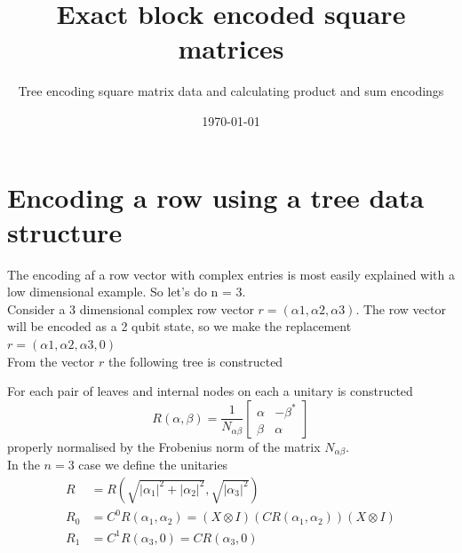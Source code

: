\documentclass[11pt]{article}
\title{Exact block encoded square matrices}
\author{Tree encoding square matrix data and calculating product and sum encodings}
\date{\today}
\begin{document}
\maketitle


%
%

\section*{Encoding a row using a tree data structure}

The encoding af a row vector with complex entries is most easily explained with a low dimensional example. So let's do n = 3. \\

Consider a 3 dimensional complex row vector $r = (\alpha1,\alpha2,\alpha3)$. 
The row vector will be encoded as a 2 qubit state, so we make the replacement  $r = (\alpha1,\alpha2,\alpha3,0)$ \\

From the vector $r$ the following tree is constructed
\begin{center}
\end{center}

For each pair of leaves and internal nodes on each a unitary is constructed
\[
R(\alpha, \beta) = \frac{1}{N_{\alpha\beta}} \begin{bmatrix} \alpha & -\beta^* \\ \beta & \alpha \end{bmatrix}
\]
properly normalised by the Frobenius norm of the matrix $N_{\alpha\beta}$. \\

In the $n=3$ case we define the unitaries
\begin{align*}
R &= R(\sqrt{|\alpha_1|^2 + |\alpha_2|^2}, \sqrt{|\alpha_3|^2}) \\
R_0 &= C^0 R(\alpha_1, \alpha_2) = (X \otimes I)(CR(\alpha_1, \alpha_2))(X \otimes I) \\
R_1 &= C^1 R(\alpha_3, 0) = CR(\alpha_3, 0)
\end{align*}
\end{document}

